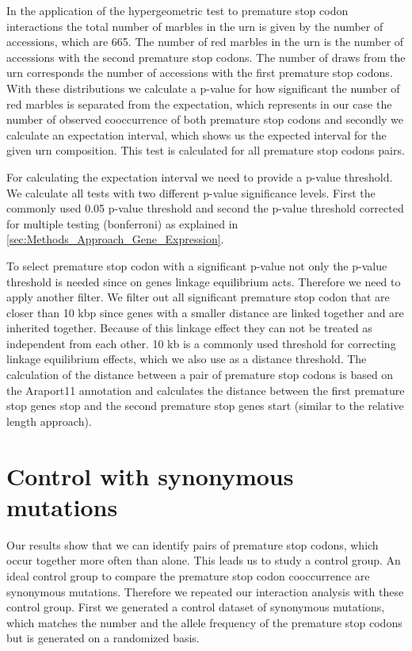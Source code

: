In the application of the hypergeometric test to premature stop codon interactions the total number of marbles in the urn is given by the number of accessions,  which are 665. The number of red marbles in the urn is the number of accessions with the second premature stop codons. The number of draws from the urn corresponds the number of accessions with the first premature stop codons. With these distributions we calculate a p-value for how significant the number of red marbles is separated from the expectation, which represents in our case the number of observed cooccurrence of both premature stop codons and secondly we calculate an expectation interval, which shows us the expected interval for the given urn composition. This test is calculated for all premature stop codons pairs. 

For calculating the expectation interval we need to provide a p-value threshold. We calculate all tests with two different p-value significance levels. First the commonly used 0.05 p-value threshold and second the p-value threshold corrected for multiple testing (bonferroni) as explained in \autoref{sec:Methods_Approach_Gene_Expression}. 

To select premature stop codon with a significant p-value not only the p-value threshold is needed since on genes linkage equilibrium acts. Therefore we need to apply another filter. We filter out all significant premature stop codon that are closer than 10 kbp since genes with a smaller distance are linked together and are inherited together. Because of this linkage effect they can not be treated as independent from each other\cite{Slatkin2008}. 10 kb is a commonly used threshold for correcting linkage equilibrium effects, which we also use as a distance threshold. The calculation of the distance between a pair of premature stop codons is based on the Araport11 annotation and calculates the distance between the first premature stop genes stop and the second premature stop genes start (similar to the relative length approach). 

\section{Control with synonymous mutations}
\label{sec:Methods_Control}
Our results show that we can identify pairs of premature stop codons,  which occur together more often than alone. This leads us to study a control group. An ideal control group to compare the premature stop codon cooccurrence are synonymous mutations. Therefore we repeated our interaction analysis with these control group. First we generated a control dataset of synonymous mutations, which matches the number and the allele frequency of the premature stop codons but is generated on a randomized basis.


